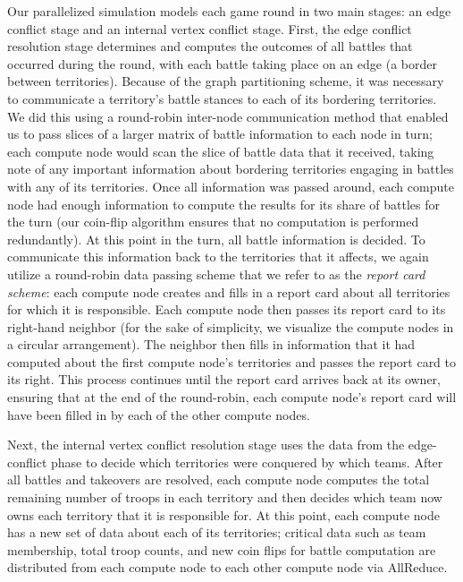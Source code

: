 \documentclass[10pt]{article}
\begin{document}
\begin{multicols}{2}
		Our parallelized simulation models each game round in two main stages: an edge conflict stage and an internal vertex conflict stage.
		First, the edge conflict resolution stage determines and computes the outcomes of all battles that occurred during the round, with each battle taking place on an edge (a border between territories). 
		Because of the graph partitioning scheme, it was necessary to communicate a territory's battle stances to each of its bordering territories.  
		We did this using a round-robin inter-node communication method that enabled us to pass slices of a larger matrix of battle information to each node in turn; each compute node would scan the slice of battle data that it received, taking note of any important information about bordering territories engaging in battles with any of its territories.  
		Once all information was passed around, each compute node had enough information to compute the results for its share of battles for the turn (our coin-flip algorithm ensures that no computation is performed redundantly).  
		At this point in the turn, all battle information is decided. 
		To communicate this information back to the territories that it affects, we again utilize a round-robin data passing scheme that we refer to as the \emph{report card scheme}: each compute node creates and fills in a report card about all territories for which it is responsible.
		Each compute node then passes its report card to its right-hand neighbor (for the sake of simplicity, we visualize the compute nodes in a circular arrangement).  
		The neighbor then fills in information that it had computed about the first compute node's territories and passes the report card to its right. 
		This process continues until the report card arrives back at its owner, ensuring that at the end of the round-robin, each compute node's report card will have been filled in by each of the other compute nodes.
		
		Next, the internal vertex conflict resolution stage uses the data from the edge-conflict phase to decide which territories were conquered by which teams. 
		After all battles and takeovers are resolved, each compute node computes the total remaining number of troops in each territory and then decides which team now owns each territory that it is responsible for.
		At this point, each compute node has a new set of data about each of its territories; critical data such as team membership, total troop counts, and new coin flips for battle computation are distributed from each compute node to each other compute node via AllReduce.
		

\end{multicols}
\end{document}

